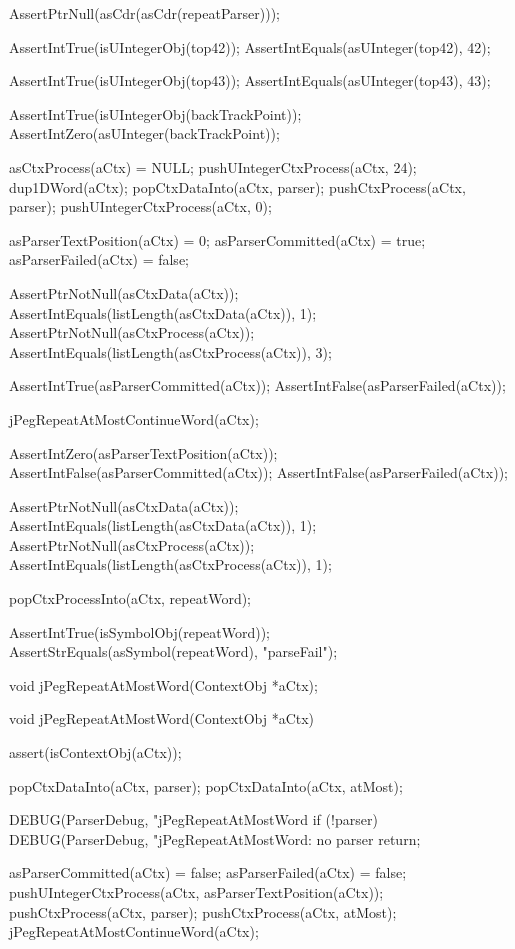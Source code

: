   AssertPtrNull(asCdr(asCdr(repeatParser)));
  
  AssertIntTrue(isUIntegerObj(top42));
  AssertIntEquals(asUInteger(top42), 42);  

  AssertIntTrue(isUIntegerObj(top43));
  AssertIntEquals(asUInteger(top43), 43);
  
  AssertIntTrue(isUIntegerObj(backTrackPoint));
  AssertIntZero(asUInteger(backTrackPoint));
\stopCTest
\stopTestCase

\startCTest
  asCtxProcess(aCtx) = NULL;
  pushUIntegerCtxProcess(aCtx, 24);
  dup1DWord(aCtx);
  popCtxDataInto(aCtx, parser);
  pushCtxProcess(aCtx, parser);
  pushUIntegerCtxProcess(aCtx, 0);

  asParserTextPosition(aCtx) = 0;
  asParserCommitted(aCtx)    = true;
  asParserFailed(aCtx)       = false;
  
  AssertPtrNotNull(asCtxData(aCtx));
  AssertIntEquals(listLength(asCtxData(aCtx)), 1);
  AssertPtrNotNull(asCtxProcess(aCtx));
  AssertIntEquals(listLength(asCtxProcess(aCtx)), 3);
  
  AssertIntTrue(asParserCommitted(aCtx));
  AssertIntFalse(asParserFailed(aCtx));
  
  jPegRepeatAtMostContinueWord(aCtx);
  
  AssertIntZero(asParserTextPosition(aCtx));
  AssertIntFalse(asParserCommitted(aCtx));
  AssertIntFalse(asParserFailed(aCtx));
  
  AssertPtrNotNull(asCtxData(aCtx));
  AssertIntEquals(listLength(asCtxData(aCtx)), 1);
  AssertPtrNotNull(asCtxProcess(aCtx));
  AssertIntEquals(listLength(asCtxProcess(aCtx)), 1);
    
  popCtxProcessInto(aCtx, repeatWord);
  
  AssertIntTrue(isSymbolObj(repeatWord));
  AssertStrEquals(asSymbol(repeatWord), "parseFail");
\stopCTest
\stopTestCase
\stopTestSuite

\startTestSuite[jPegRepeatAtMostWord]

\startCHeader
void jPegRepeatAtMostWord(ContextObj *aCtx);
\stopCHeader

\startCCode
void jPegRepeatAtMostWord(ContextObj *aCtx) {
  assert(isContextObj(aCtx));
  
  popCtxDataInto(aCtx, parser);
  popCtxDataInto(aCtx, atMost);
  
  DEBUG(ParserDebug, "jPegRepeatAtMostWord%
  if (!parser) {
    DEBUG(ParserDebug, "jPegRepeatAtMostWord: no parser%
    return;
  }
  
  asParserCommitted(aCtx) = false;
  asParserFailed(aCtx)    = false;
  pushUIntegerCtxProcess(aCtx, asParserTextPosition(aCtx));
  pushCtxProcess(aCtx, parser);
  pushCtxProcess(aCtx, atMost);
  jPegRepeatAtMostContinueWord(aCtx);
}
\stopCCode

